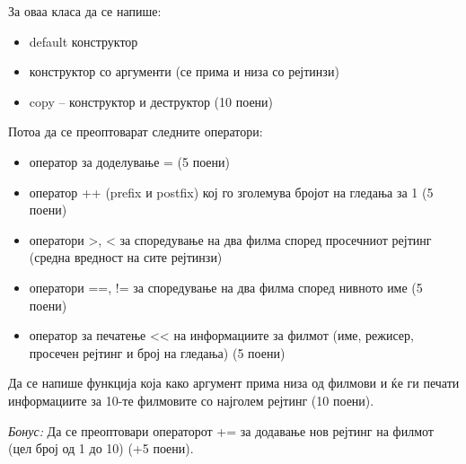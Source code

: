 \documentclass[12pt,a4paper]{exam}
\begin{document}
\begin{questions}
За оваа класа да се напише:
\begin{itemize}
  \item default конструктор
  \item конструктор со аргументи (се прима и низа со рејтинзи)
  \item copy – конструктор и деструктор (10 поени)
\end{itemize}
Потоа да се преоптоварат следните оператори:
\begin{itemize}
  \item оператор за доделување = (5 поени)
  \item оператор ++ (prefix и postfix) кој го зголемува бројот на гледања за 1
  (5 поени)
  \item оператори >, < за споредување на два филма според просечниот рејтинг (средна
вредност на сите рејтинзи)
\item оператори ==, != за споредување на два филма според нивното име (5 поени)
\item оператор за печатење << на информациите за филмот (име, режисер, просечен
рејтинг и број на гледања) (5 поени)
\end{itemize}
Да се напише функција која како аргумент прима низа од филмови и ќе ги печати
информациите за 10-те филмовите со најголем рејтинг (10 поени).

\emph{Бонус:} Да се преоптовари операторот += за додавање нов рејтинг на филмот (цел број
од 1 до 10) (+5 поени).


\end{questions}
\end{document}
